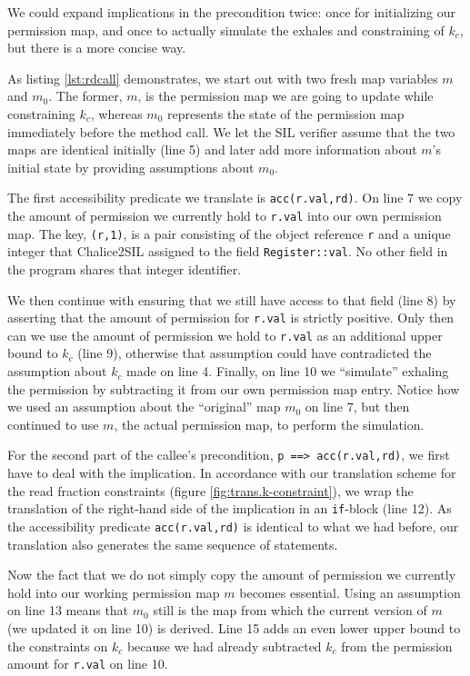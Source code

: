 We could expand implications in the precondition twice: once for initializing our permission map, and once to actually simulate the exhales and constraining of $k_c$, but there is a more concise way.

As listing \ref{lst:rdcall} demonstrates, we start out with two fresh map variables $m$ and $m_0$. The former, $m$, is the permission map we are going to update while constraining $k_c$, whereas $m_0$ represents the state of the permission map immediately before the method call. 
We let the SIL verifier assume that the two maps are identical initially (line 5) and later add more information about $m$'s initial state by providing assumptions about $m_0$.

The first accessibility predicate we translate is \lstinline[language=Chalice]!acc(r.val,rd)!. 
On line 7 we copy the amount of permission we currently hold to \lstinline!r.val! into our own permission map.
The key, \lstinline!(r,1)!, is a pair consisting of the object reference \lstinline!r! and a unique integer that Chalice2SIL assigned to the field \lstinline[language=SIL]!Register::val!.
No other field in the program shares that integer identifier.

We then continue with ensuring that we still have access to that field (line 8) by asserting that the amount of permission for \lstinline!r.val! is strictly positive.
Only then can we use the amount of permission we hold to \lstinline!r.val! as an additional upper bound to $k_c$ (line 9), otherwise that assumption could have contradicted the assumption about $k_c$ made on line 4.
Finally, on line 10 we ``simulate'' exhaling the permission by subtracting it from our own permission map entry.
Notice how we used an assumption about the ``original'' map $m_0$ on line 7, but then continued to use $m$, the actual permission map, to perform the simulation.

For the second part of the callee's precondition, \lstinline[language=Chalice]!p ==> acc(r.val,rd)!, we first have to deal with the implication.
In accordance with our translation scheme for the read fraction constraints (figure \ref{fig:trans.k-constraint}), we wrap the translation of the right-hand side of the implication in an \lstinline[language=Chalice]!if!-block (line 12).
As the accessibility predicate \lstinline[language=Chalice]!acc(r.val,rd)! is identical to what we had before, our translation also generates the same sequence of statements.

Now the fact that we do not simply copy the amount of permission we currently hold into our working permission map $m$ becomes essential.
Using an assumption on line 13 means that $m_0$ still is the map from which the current version of $m$ (we updated it on line 10) is derived.
Line 15 adds an even lower upper bound to the constraints on $k_c$ because we had already subtracted $k_c$ from the permission amount for \lstinline!r.val! on line 10.

